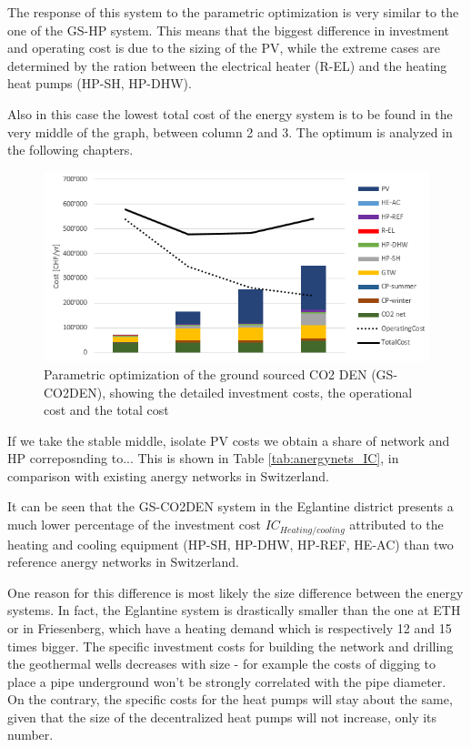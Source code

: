 \documentclass{article}
\begin{document}
The response of this system to the parametric optimization is very similar to the one of the GS-HP system. This means that the biggest difference in investment and operating cost is due to the sizing of the PV, while the extreme cases are determined by the ration between the electrical heater (R-EL) and the heating heat pumps (HP-SH, HP-DHW).

Also in this case the lowest total cost of the energy system is to be found in the very middle of the graph, between column 2 and 3. The optimum is analyzed in the following chapters.

\begin{figure}[htp]
	\centering
	\includegraphics[width=1\textwidth]{V_CO2_G_PO1.png}
	\caption{Parametric optimization of the ground sourced CO2 DEN (GS-CO2DEN), showing the detailed investment costs, the operational cost and the total cost}
	\label{fig:V_CO2_G_PO}
\end{figure}

If we take the stable middle, isolate PV costs we obtain a share of network and HP correposnding to... This is shown in  Table \ref{tab:anergynets_IC}, in comparison with existing anergy networks in Switzerland.



It can be seen that the GS-CO2DEN system in the Eglantine district presents a much lower percentage of the investment cost  $IC_{Heating/cooling}$ attributed to the heating and cooling equipment (HP-SH, HP-DHW, HP-REF, HE-AC) than two reference anergy networks in Switzerland. 

One reason for this difference is most likely the size difference between the energy systems. In fact, the Eglantine system is drastically smaller than the one at ETH or in Friesenberg, which have a heating demand which is respectively 12 and 15 times bigger. The specific investment costs for building the network and drilling the geothermal wells decreases with size - for example the costs of digging to place a pipe underground won't be strongly correlated with the pipe diameter. On the contrary, the specific costs for the heat pumps will stay about the same, given that the size of the decentralized heat pumps will not increase, only its number.
\end{document}
